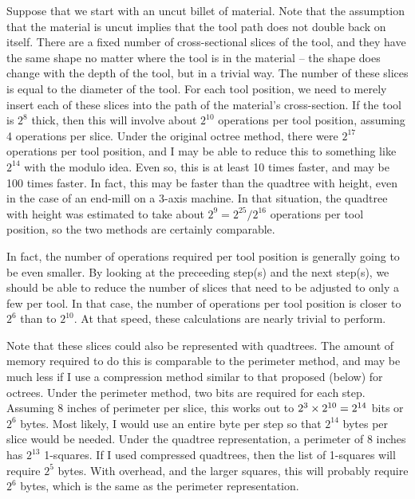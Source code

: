 \documentclass[titlepage,oneside,10pt]{article}
\begin{document}
Suppose that we start with an uncut billet of material. Note that the
assumption that the material is uncut implies that the tool path does
not double back on itself. There are a fixed number of cross-sectional
slices of the tool, and they have the same shape no matter where the
tool is in the material -- the shape does change with the depth of the
tool, but in a trivial way. The number of these slices is equal to the
diameter of the tool. For each tool position, we need to merely insert each
of these slices into the path of the material's cross-section. If the
tool is $2^8$ thick, then this will involve about $2^{10}$ operations
per tool position, assuming 4 operations per slice. Under the original
octree method, there were $2^{17}$ operations per tool position, and I
may be able to reduce this to something like $2^{14}$ with the modulo
idea. Even so, this is at least 10 times faster, and may be 100 times
faster. In fact, this may be faster than the quadtree with height,
even in the case of an end-mill on a 3-axis machine. In that
situation, the quadtree with height was estimated to take about $2^9 =
2^{25}/2^{16}$ operations per tool position, so the two methods are
certainly comparable.

In fact, the number of operations required per tool position is
generally going to be even smaller. By looking at the preceeding step(s) 
and the next step(s), we should be able to reduce the number of slices
that need to be adjusted to only a few per tool. In that case, the
number of operations per tool position is closer to $2^6$ than to
$2^{10}$. At that speed, these calculations are nearly trivial to
perform.

Note that these slices could also be represented with quadtrees. The
amount of memory required to do this is comparable to the perimeter
method, and may be much less if I use a compression method similar to
that proposed (below) for octrees. Under the perimeter method, two
bits are required for each step. Assuming 8 inches of perimeter per
slice, this works out to $2^3\times 2^{10}\time 2 = 2^{14}$ bits or
$2^{6}$ bytes. Most likely, I would use an entire byte per step so
that $2^{14}$ bytes per slice would be needed. Under the quadtree
representation, a perimeter of 8 inches has $2^{13}$ 1-squares. If I
used compressed quadtrees, then the list of 1-squares will require
$2^{5}$ bytes. With overhead, and the larger squares, this will
probably require $2^6$ bytes, which is the same as the perimeter
representation.
\end{document}

